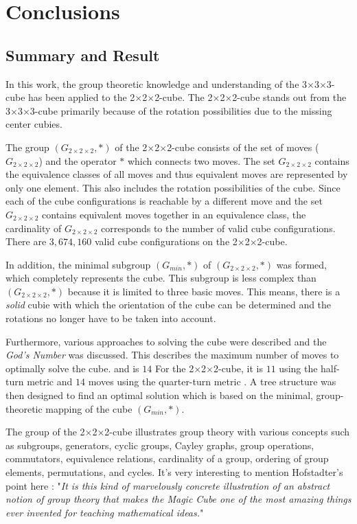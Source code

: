 \documentclass[12pt,a4paper]{article}
\theoremstyle{custom}
\newcommand{\Gtwo}{\ensuremath{G_{2\times 2\times 2}}}
\newcommand{\Ttwo}{2$\times$2$\times$2-}
\newcommand{\Tthree}{3$\times$3$\times$3-}
\begin{document}
\section{Conclusions}

\label{Chapter_Conclusion}
\subsection*{Summary and Result}
In this work, the group theoretic knowledge and understanding  of the \Tthree cube has been applied to the \Ttwo cube. The \Ttwo cube stands out from the \Tthree cube primarily because of the rotation possibilities due to the missing center cubies. 

The group $\left(\Gtwo, \scriptstyle*\right)$ of the \Ttwo cube consists of the set of moves ($\Gtwo$) and the operator $\scriptstyle*$ which connects two moves. The set $\Gtwo$ contains the equivalence classes of all moves and thus equivalent moves are represented by only one element. This also includes the rotation possibilities of the cube.
Since each of the cube configurations is reachable by a different move and the set $\Gtwo$ contains equivalent moves together in an equivalence class, the cardinality of $\Gtwo$ corresponds to the number of valid cube configurations. There are $3, 674, 160$ valid cube configurations on the \Ttwo cube.

In addition, the minimal subgroup $\left(G_{min}, \scriptstyle*\right)$ of $\left(\Gtwo, \scriptstyle*\right)$ was formed, which completely represents the cube. This subgroup is less complex than $\left(\Gtwo, \scriptstyle*\right)$ because it is limited to three basic moves. This means, there is a \textit{solid} cubie with which the orientation of the cube can be determined and the rotations no longer have to be taken into account.

Furthermore, various approaches to solving the cube were described and the \textit{God's Number} was discussed. This describes the maximum number of moves to optimally solve the cube.  and is $14$ For the \Ttwo cube, it is $11$ using the half- turn metric and $14$ moves using the quarter-turn metric . A tree structure was then designed to find an optimal solution which is based on the minimal, group-theoretic mapping of the cube $\left(G_{min}, \scriptstyle*\right)$.

The group of the \Ttwo cube illustrates group theory with various concepts such as subgroups, generators, cyclic groups, Cayley graphs, group operations, commutators, equivalence relations, cardinality of a group, ordering of group elements, permutations, and cycles. It's very interesting to mention Hofstadter's point \cite{Hofstader} here : "\textit{It is this kind of marvelously concrete illustration of an abstract notion of group theory that makes the Magic Cube one of the most amazing things ever invented for teaching mathematical ideas.}"
\end{document}
